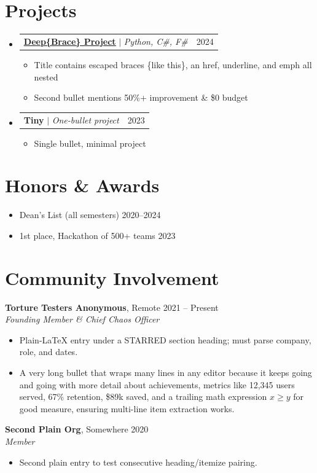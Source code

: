 \documentclass[letterpaper,11pt]{article}
\makeatletter
\newcommand{\resumeItem}[1]{
  \item\small{
    {#1 \vspace{-2pt}}
  }
}
\newcommand{\resumeProjectHeading}[2]{
    \item
    \begin{tabular*}{0.97\textwidth}{l@{\extracolsep{\fill}}r}
      \small#1 & #2 \\
    \end{tabular*}\vspace{-7pt}
}
\newcommand{\resumeSubHeadingListStart}{\begin{itemize}[leftmargin=0.15in, label={}]}
\newcommand{\resumeSubHeadingListEnd}{\end{itemize}}
\newcommand{\resumeItemListStart}{\begin{itemize}}
\newcommand{\resumeItemListEnd}{\end{itemize}\vspace{-5pt}}
\makeatother
\begin{document}
\section{Projects}
    \resumeSubHeadingListStart
      \resumeProjectHeading
          {\textbf{\href{https://github.com/x/y_z}{\underline{Deep\{Brace\} Project}}} $|$ \emph{Python, C\#, F\#}}{2024}
          \resumeItemListStart
            \resumeItem{Title contains escaped braces \{like this\}, an href, underline, and emph all nested}
            \resumeItem{Second bullet mentions 50\%+ improvement \& \$0 budget}
          \resumeItemListEnd
      \resumeProjectHeading
          {\textbf{Tiny} $|$ \emph{One-bullet project}}{2023}
          \resumeItemListStart
            \resumeItem{Single bullet, minimal project}
          \resumeItemListEnd
    \resumeSubHeadingListEnd

\section{Honors \& Awards}
\resumeSubHeadingListStart
    \resumeItemListStart
        \resumeItem{Dean's List (all semesters) \null\hfill 2020--2024}
        \resumeItem{1st place, Hackathon of 500+ teams \null\hfill 2023}
    \resumeItemListEnd
  \resumeSubHeadingListEnd

\section*{Community Involvement}
\textbf{Torture Testers Anonymous}, Remote \hfill 2021 -- Present \\
\textit{Founding Member \& Chief Chaos Officer}
\begin{itemize}
    \item Plain-LaTeX entry under a STARRED section heading; must parse company, role, and dates.
    \item A very long bullet that wraps many lines in any editor because it keeps going and going with more detail about achievements, metrics like 12,345 users served, 67\% retention, \$89k saved, and a trailing math expression $x \geq y$ for good measure, ensuring multi-line item extraction works.
\end{itemize}

\textbf{Second Plain Org}, Somewhere \hfill 2020 \\
\textit{Member}
\begin{itemize}
    \item Second plain entry to test consecutive heading/itemize pairing.
\end{itemize}
\end{document}
